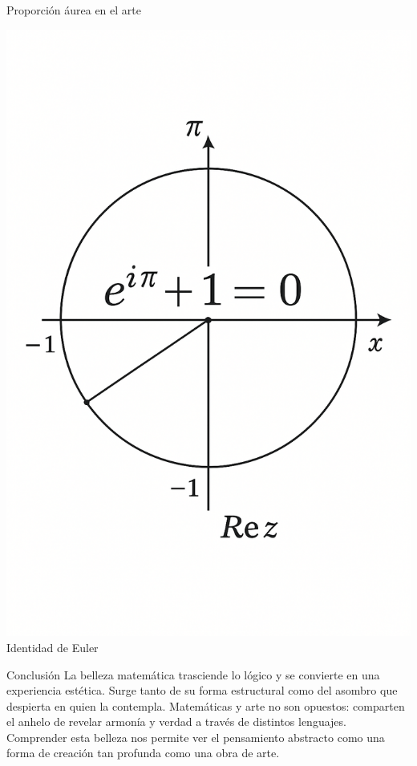 \documentclass[final]{beamer}
\begin{document}
\begin{frame}[t]
\begin{center}
\begin{minipage}[t]{0.32\textwidth}
    \small Proporción áurea en el arte
\end{minipage}
\hfill
\begin{minipage}[t]{0.32\textwidth}
    \centering
    \includegraphics[width=0.8\linewidth]{imagen2.png}\\
    \small Identidad de Euler
\end{minipage}
\end{center}

\vspace{1cm}


\vspace{1.5cm}
\begin{block}{Conclusión}
La belleza matemática trasciende lo lógico y se convierte en una experiencia estética. Surge tanto de su forma estructural como del asombro que despierta en quien la contempla. Matemáticas y arte no son opuestos: comparten el anhelo de revelar armonía y verdad a través de distintos lenguajes. Comprender esta belleza nos permite ver el pensamiento abstracto como una forma de creación tan profunda como una obra de arte.
\end{block}

\end{frame}
\end{document}
